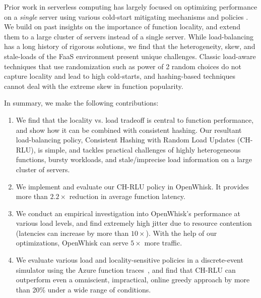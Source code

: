 Prior work in serverless computing has largely focused on optimizing performance on a \emph{single} server using various cold-start mitigating mechanisms and policies \cite{vhive-asplos21,faascache-asplos21}. 
We build on past insights on the importance of function locality, and extend them to a large cluster of servers instead of a single server. 
While load-balancing has a long history of rigorous solutions, we find that the heterogeneity, skew, and stale-loads of the FaaS environment present unique challenges. 
Classic load-aware techniques that use randomization such as power of 2 random choices do not capture locality and lead to high cold-starts, and hashing-based techniques cannot deal with the extreme skew in function popularity.



In summary, we make the following contributions:

\begin{enumerate}
\item We find that the locality vs. load tradeoff is central to function performance, and show how it can be combined with consistent hashing. Our resultant load-balancing policy, Consistent Hashing with Random Load Updates (CH-RLU), is simple, and tackles practical challenges of highly heterogeneous functions, bursty workloads, and stale/imprecise load information on a large cluster of servers.
\item We implement and evaluate our CH-RLU policy in OpenWhisk. It provides more than $2.2\times$ reduction in average function latency.
\item We conduct an empirical investigation into OpenWhisk's performance at various load levels, and find extremely high jitter due to resource contention (latencies can increase by more than $10\times$).
  With the help of our optimizations, OpenWhisk can serve $5\times$ more traffic. 
\item We evaluate various load and locality-sensitive policies in a discrete-event simulator using the Azure function traces~\cite{shahrad_serverless_2020}, and find that CH-RLU can outperform even a omniscient, impractical, online greedy approach by more than 20\% under a wide range of conditions. 
\end{enumerate}


